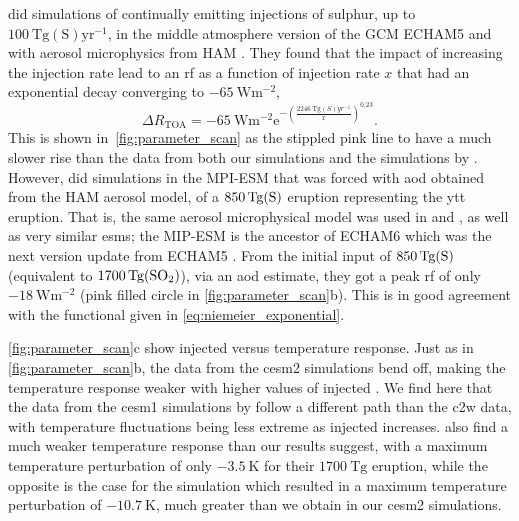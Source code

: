 \documentclass[twocol]{ametsocV6.1}
\newcommand{\iso}[1][i]{{#1}njected \ce{SO2}}
\begin{document}
\citet{niemeier2015} did simulations of continually emitting injections of sulphur, up
to \(\SI{100}{\tera\gram \mathrm{(S)}\mathrm{yr}^{-1}}\), in the middle atmosphere
version of the GCM ECHAM5 \citep{giorgetta2006} and with aerosol microphysics from HAM
\citep{stier2005}. They found that the impact of increasing the injection rate lead to
an \gls{rf} as a function of injection rate \(x\) that had an exponential decay
converging to \(\SI{-65}{\watt\meter^{-2}}\),
\begin{equation}
  \Delta
  R_{\mathrm{TOA}} =
  -\SI{65}{\watt\metre^{-2}}
  \mathrm{e}^{-{\left(\frac{\SI{2246}{\tera\gram(S)yr^{-1}}}{x}\right)}^{0.23}}.
  \label{eq:niemeier_exponential}
\end{equation}
%
This is shown in~\ref{fig:parameter_scan} as the stippled pink line to have a much
slower rise than the data from both our simulations and the simulations by
\citet{ottobliesner2016}. However, \citet{timmreck2010} did simulations in the MPI-ESM
that was forced with \gls{aod} obtained from the HAM aerosol model, of a
\(\SI{850}{\tera\gram(\ce{S})}\) eruption representing the \gls{ytt} eruption. That is,
the same aerosol microphysical model was used in \citet{timmreck2010} and
\citet{niemeier2015}, as well as very similar \glspl{esm}; the MIP-ESM is the ancestor
of ECHAM6 which was the next version update from ECHAM5 \citep{kuma2023}. From the
initial input of \(\SI{850}{\tera\gram(\ce{S})}\) (equivalent to
\(\SI{1700}{\tera\gram(\ce{SO2})}\)), via an \gls{aod} estimate, they got a peak
\gls{rf} of only \(\SI{-18}{\watt\metre^{-2}}\) (pink filled circle in
\ref{fig:parameter_scan}b). This is in good agreement with the functional given in
\ref{eq:niemeier_exponential}.

\ref{fig:parameter_scan}c show \iso{} versus temperature response. Just as in
\ref{fig:parameter_scan}b, the data from the \gls{cesm2} simulations bend off, making the
temperature response weaker with higher values of \iso. We find here that the data from
the \gls{cesm1} simulations by \citet{ottobliesner2016} follow a different path than the
\gls{c2w} data, with temperature fluctuations being less extreme as \iso{} increases.
\citet{timmreck2010} also find a much weaker temperature response than our results
suggest, with a maximum temperature perturbation of only \(\SI{-3.5}{\kelvin}\) for
their \(\SI{1700}{\tera\gram}\)  eruption, while the opposite is the case for
the \citet{jones2005} simulation which resulted in a maximum temperature perturbation of
\(\SI{-10.7}{\kelvin}\), much greater than we obtain in our \gls{cesm2} simulations.
\end{document}
